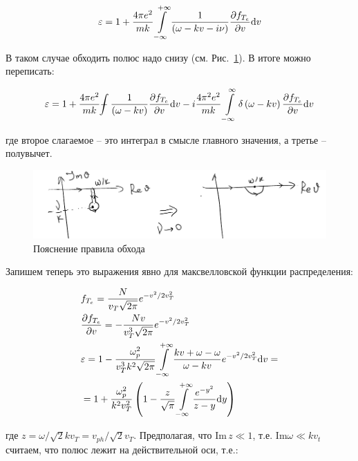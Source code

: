 \documentclass[10pt, a4paper]{article}
\def\Xint#1{\mathchoice
 {\XXint\displaystyle\textstyle{#1}}%
 {\XXint\textstyle\scriptstyle{#1}}%
 {\XXint\scriptstyle\scriptscriptstyle{#1}}%
 {\XXint\scriptscriptstyle\scriptscriptstyle{#1}}%
 \!\int}
\def\XXint#1#2#3{{\setbox0=\hbox{$#1{#2#3}{\int}$}
   \vcenter{\hbox{$#2#3$}}\kern-.5\wd0}}
\def\dashint{\Xint-}
\begin{document}
\begin{equation*}
	\varepsilon = 1 + \frac{4\pi e^2}{mk}\int\limits_{-\infty}^{+\infty}\frac{1}{\left( \omega - kv - i\nu\right)}\pdv{f_{T_e}}{v}\dd v
\end{equation*}

В таком случае обходить полюс надо снизу (см. Рис.~\ref{fig.7.pole}). В итоге можно переписать:

\begin{equation*}
	\varepsilon = 1 + \frac{4\pi e^2}{mk}\dashint\frac{1}{\left( \omega - kv \right)}\pdv{f_{T_e}}{v}\dd v - i\frac{4\pi^2 e^2}{mk}\int\limits_{-\infty}^{\infty}\delta\left( \omega - kv \right)\pdv{f_{T_e}}{v}\dd v
\end{equation*}

где второе слагаемое -- это интеграл в смысле главного значения, а третье -- полувычет.

\begin{figure}[ht]
	\label{fig.7.pole} 
	\begin{center}
		\includegraphics[width=1\linewidth]{7.pole.pdf}
	\end{center}
	\caption{Пояснение правила обхода}
\end{figure}

Запишем теперь это выражения явно для максвелловской функции распределения:

\begin{align*}
	& f_{T_e} = \frac{N}{v_T\sqrt{2\pi}} e^{-v^2/2 v_T^2} \\
	& \pdv{f_{T_e}}{v} = -\frac{Nv}{v_T^3 \sqrt{2\pi}}e^{-v^2/ 2 v_T^2} \\
	& \varepsilon = 1 - \frac{\omega_p^2}{v_T^3 k^2\sqrt{2\pi}}\int\limits_{-\infty}^{+\infty}\frac{kv + \omega - \omega }{\omega - kv} e^{-v^2/ 2 v_T^2} \dd v = \\
	&= 1 + \frac{\omega_p^2}{k^2 v_T^2} \left( 1 - \frac{z}{\sqrt{\pi}}\int\limits_{-\infty}^{+\infty}\frac{e^{-y^2}}{z-y}\dd y \right)
\end{align*} 

где $z = \omega/\sqrt{2}kv_T = v_{ph}/\sqrt{2}v_T$. Предполагая, что $\text{Im}\,z\ll 1$, т.е. $\text{Im}\omega \ll kv_t$ считаем, что полюс лежит на действительной оси, т.е.:
\end{document}
